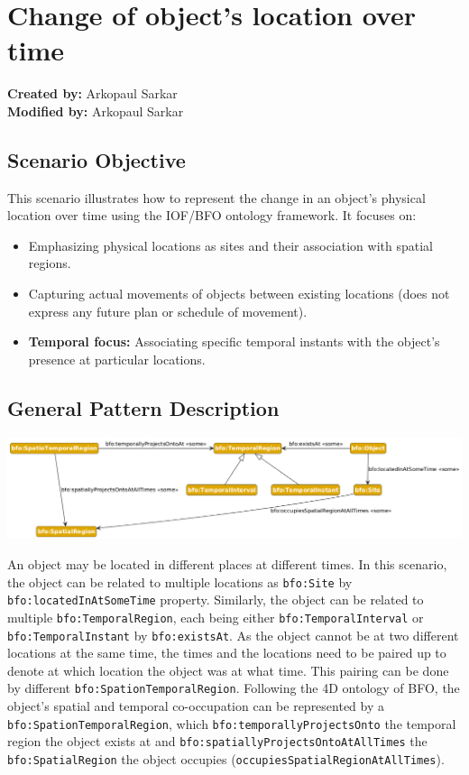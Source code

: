 \section{Change of object's location over time}
\label{sec-change-location}

\textbf{Created by:} Arkopaul Sarkar \\
\textbf{Modified by:} Arkopaul Sarkar \\

\subsection*{Scenario Objective}

This scenario illustrates how to represent the change in an object's physical location over time using the IOF/BFO ontology framework. It focuses on:
\begin{itemize}
    \item Emphasizing physical locations as sites and their association with spatial regions.
    \item Capturing actual movements of objects between existing locations (does not express any future plan or schedule of movement).
    \item \textbf{Temporal focus:} Associating specific temporal instants with the object's presence at particular locations.
\end{itemize}

\subsection*{General Pattern Description}
\includegraphics[scale=0.38]{scenarios/location-change/images/change-of-location-general.png}

An object may be located in different places at different times. In this scenario, the object can be related to multiple locations as \texttt{bfo:Site} by \texttt{bfo:locatedInAtSomeTime} property. Similarly, the object can be related to multiple \texttt{bfo:TemporalRegion}, each being either \texttt{bfo:TemporalInterval} or \texttt{bfo:TemporalInstant} by \texttt{bfo:existsAt}. As the object cannot be at two different locations at the same time, the times and the locations need to be paired up to denote at which location the object was at what time. This pairing can be done by different \texttt{bfo:SpationTemporalRegion}. Following the 4D ontology of BFO, the object's spatial and temporal co-occupation can be represented by a \texttt{bfo:SpationTemporalRegion}, which \texttt{bfo:temporallyProjectsOnto} the temporal region the object exists at and \texttt{bfo:spatiallyProjectsOntoAtAllTimes} the \texttt{bfo:SpatialRegion} the object occupies (\texttt{occupiesSpatialRegionAtAllTimes}). 

